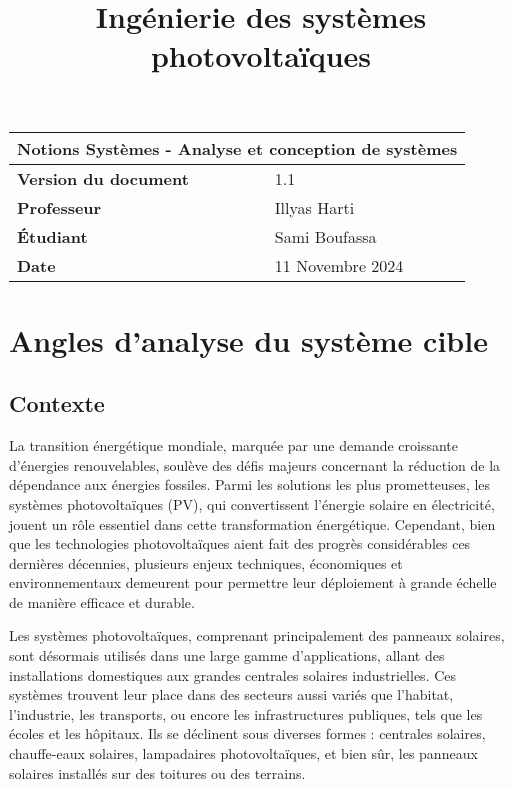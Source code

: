 \documentclass{article}
\title{Ingénierie des systèmes photovoltaïques}
\author{}
\date{\vspace{-5ex}}
\begin{document}
\maketitle

\begin{center}
    \begin{tabular}{|l|l|}
        \hline
        \multicolumn{2}{|c|}{\textbf{Notions Systèmes - Analyse et conception de systèmes}} \\
        \hline
        \textbf{Version du document} & 1.1 \\
        \hline
        \textbf{Professeur} & Illyas Harti\\
        \hline
        \textbf{Étudiant} & Sami Boufassa\\
                            
        \hline
        \textbf{Date} & 11 Novembre 2024 \\
        \hline
    \end{tabular}
\end{center}

\tableofcontents

\newpage

\section{Angles d'analyse du système cible}
\subsection{Contexte}
La transition énergétique mondiale, marquée par une demande croissante d'énergies renouvelables, soulève des défis majeurs concernant la réduction de la dépendance aux énergies fossiles. Parmi les solutions les plus prometteuses, les systèmes photovoltaïques (PV), qui convertissent l'énergie solaire en électricité, jouent un rôle essentiel dans cette transformation énergétique. Cependant, bien que les technologies photovoltaïques aient fait des progrès considérables ces dernières décennies, plusieurs enjeux techniques, économiques et environnementaux demeurent pour permettre leur déploiement à grande échelle de manière efficace et durable.

Les systèmes photovoltaïques, comprenant principalement des panneaux solaires, sont désormais utilisés dans une large gamme d'applications, allant des installations domestiques aux grandes centrales solaires industrielles. Ces systèmes trouvent leur place dans des secteurs aussi variés que l'habitat, l'industrie, les transports, ou encore les infrastructures publiques, tels que les écoles et les hôpitaux. Ils se déclinent sous diverses formes : centrales solaires, chauffe-eaux solaires, lampadaires photovoltaïques, et bien sûr, les panneaux solaires installés sur des toitures ou des terrains.
\end{document}
